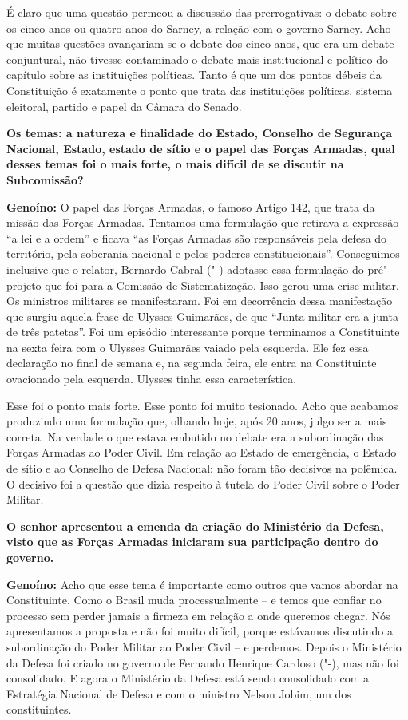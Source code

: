 É claro que uma questão permeou a discussão das prerrogativas: o debate
sobre os cinco anos ou quatro anos do Sarney, a relação com o governo
Sarney. Acho que muitas questões avançariam se o debate dos cinco anos,
que era um debate conjuntural, não tivesse contaminado o debate mais
institucional e político do capítulo sobre as instituições políticas.
Tanto é que um dos pontos débeis da Constituição é exatamente o ponto
que trata das instituições políticas, sistema eleitoral, partido e papel
da Câmara do Senado.

\textbf{Os temas: a natureza e finalidade do Estado, Conselho de
Segurança Nacional, Estado, estado de sítio e o papel das Forças
Armadas, qual desses temas foi o mais forte, o mais difícil de se
discutir na Subcomissão?}

\textbf{Genoíno:} O papel das Forças Armadas, o famoso Artigo 142, que
trata da missão das Forças Armadas. Tentamos uma formulação que retirava
a expressão ``a lei e a ordem'' e ficava ``as Forças Armadas são
responsáveis pela defesa do território, pela soberania nacional e pelos
poderes constitucionais''. Conseguimos inclusive que o relator, Bernardo
Cabral ("-) adotasse essa formulação do pré"-projeto que foi para a
Comissão de Sistematização. Isso gerou uma crise militar. Os ministros
militares se manifestaram. Foi em decorrência dessa manifestação que
surgiu aquela frase de Ulysses Guimarães, de que ``Junta militar era a
junta de três patetas''. Foi um episódio interessante porque terminamos
a Constituinte na sexta feira com o Ulysses Guimarães vaiado pela
esquerda. Ele fez essa declaração no final de semana e, na segunda
feira, ele entra na Constituinte ovacionado pela esquerda. Ulysses tinha
essa característica.

Esse foi o ponto mais forte. Esse ponto foi muito tesionado. Acho que
acabamos produzindo uma formulação que, olhando hoje, após 20 anos,
julgo ser a mais correta. Na verdade o que estava embutido no debate era
a subordinação das Forças Armadas ao Poder Civil. Em relação ao Estado
de emergência, o Estado de sítio e ao Conselho de Defesa Nacional: não
foram tão decisivos na polêmica. O decisivo foi a questão que dizia
respeito à tutela do Poder Civil sobre o Poder Militar.

\textbf{O senhor apresentou a emenda da criação do Ministério da Defesa,
visto que as Forças Armadas iniciaram sua participação dentro do
governo.}

\textbf{Genoíno:} Acho que esse tema é importante como outros que vamos
abordar na Constituinte. Como o Brasil muda processualmente -- e temos
que confiar no processo sem perder jamais a firmeza em relação a onde
queremos chegar. Nós apresentamos a proposta e não foi muito difícil,
porque estávamos discutindo a subordinação do Poder Militar ao Poder
Civil -- e perdemos. Depois o Ministério da Defesa foi criado no governo
de Fernando Henrique Cardoso ("-), mas não foi consolidado. E agora
o Ministério da Defesa está sendo consolidado com a Estratégia Nacional
de Defesa e com o ministro Nelson Jobim, um dos constituintes.

